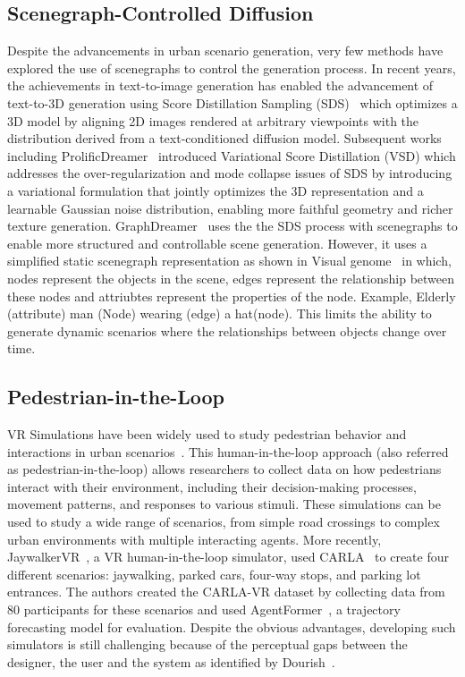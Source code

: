 \documentclass{article}
\begin{document}
\subsection{Scenegraph-Controlled Diffusion}

Despite the advancements in urban scenario generation, very few methods have explored the use of scenegraphs to control the generation process. In recent years, the achievements in text-to-image generation has enabled the advancement of text-to-3D generation using Score Distillation Sampling (SDS)~\cite{poole2022dreamfusion} which optimizes a 3D model by aligning 2D images rendered at arbitrary viewpoints with the distribution derived from a text-conditioned diffusion model. Subsequent works including ProlificDreamer~\cite{wang2023prolificdreamer} introduced Variational Score Distillation (VSD) which addresses the over-regularization and mode collapse issues of SDS by introducing a variational formulation that jointly optimizes the 3D representation and a learnable Gaussian noise distribution, enabling more faithful geometry and richer texture generation. GraphDreamer~\cite{gao2024graphdreamer}  uses the the SDS process with scenegraphs to enable more structured and controllable scene generation. However, it uses a simplified static scenegraph representation as shown in Visual genome~\cite{krishna2017visual} in which, nodes represent the objects in the scene, edges represent the relationship between these nodes and attriubtes represent the properties of the node. Example, Elderly (attribute) man (Node) wearing (edge) a hat(node). This limits the ability to generate dynamic scenarios where the relationships between objects change over time.

\subsection{Pedestrian-in-the-Loop}

VR Simulations have been widely used to study pedestrian behavior and interactions in urban scenarios~\cite{wu2018using,tran2021review,mukoya2024jaywalkervr,schneider2020virtually}. This human-in-the-loop approach (also referred as pedestrian-in-the-loop\cite{hartmann2017pedestrian}) allows researchers to collect data on how pedestrians interact with their environment, including their decision-making processes, movement patterns, and responses to various stimuli. These simulations can be used to study a wide range of scenarios, from simple road crossings to complex urban environments with multiple interacting agents. More recently, JaywalkerVR~\cite{mukoya2024jaywalkervr}, a VR human-in-the-loop simulator, used CARLA~\cite{dosovitskiy2017carla} to create four different scenarios: jaywalking, parked cars, four-way stops, and parking lot entrances. The authors created the CARLA-VR dataset by collecting data from 80 participants for these scenarios and used AgentFormer~\cite{yuan2021agentformer}, a trajectory forecasting model for evaluation. Despite the obvious advantages, developing such simulators is still challenging because of the perceptual gaps between the designer, the user and the system as identified by Dourish~\cite{dourish2001action}.
\end{document}
